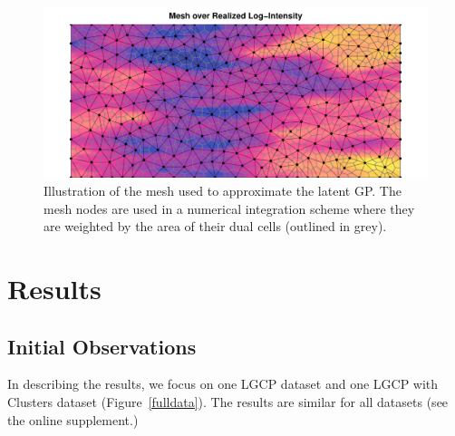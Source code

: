 \documentclass[review]{elsarticle}
\begin{document}
\begin{figure}
\includegraphics[width=5in]{../graphics/mesh-LGCP000004.pdf}
\caption{Illustration of the mesh used to approximate the latent GP. The mesh
nodes are used in a numerical integration scheme where they are weighted by the
area of their dual cells (outlined in grey).}
\label{meshfull}
\end{figure}




\section{Results}

\subsection{Initial Observations}

In describing the results, we focus on one LGCP dataset and one LGCP with
Clusters dataset (Figure~\ref{fulldata}). The results are similar for all
datasets (see the online supplement.)
\end{document}
